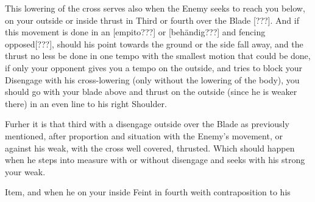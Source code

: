 This lowering of the cross serves also when the Enemy seeks to reach
you below, on your outside or inside thrust in Third or fourth over the
Blade [???]. And if this movement is done in an [empito???] or
[beh{\"a}ndig???] and fencing opposed[???], should his point towards
the ground or the side fall away, and the thrust no less be done in
one tempo with the smallest motion that could be done, if only your
opponent gives you a tempo on the outside, and tries to block your
Disengage with his cross-lowering (only without the lowering of the
body), you should go with your blade above and thrust on the outside
(since he is weaker there) in an even line to his right Shoulder.


Furher it is that third with a disengage outside over the Blade as
previously mentioned, after proportion and situation with the Enemy's
movement, or against his weak, with the cross well covered,
thrusted. Which should happen when he steps into measure with or
without disengage and seeks with his strong your weak.


Item, and when he on your inside Feint in fourth weith contraposition
to his